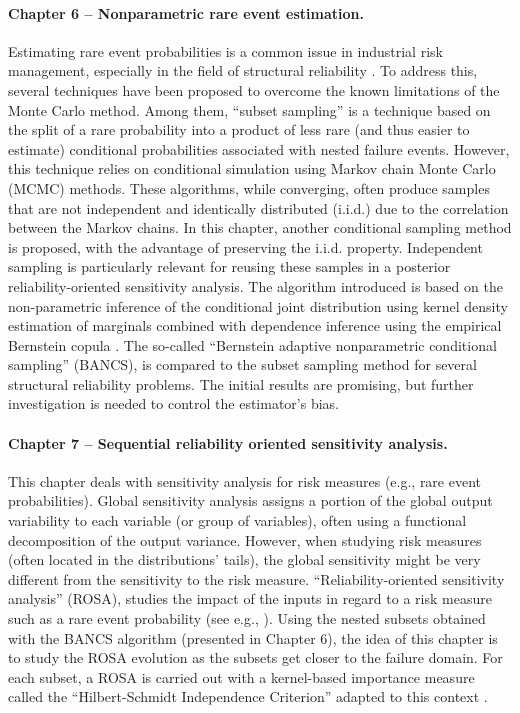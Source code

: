 \paragraph{Chapter 6 -- Nonparametric rare event estimation.} 
Estimating rare event probabilities is a common issue in industrial risk management, especially in the field of structural reliability \citep{chabridon_2018_thesis}. 
To address this, several techniques have been proposed to overcome the known limitations of the Monte Carlo method. 
Among them, ``subset sampling'' \citep{AuBeck2001} is a technique based on the split of a rare probability into a product of less rare (and thus easier to estimate) conditional probabilities associated with nested failure events. 
However, this technique relies on conditional simulation using Markov chain Monte Carlo (MCMC) methods. 
These algorithms, while converging, often produce samples that are not independent and identically distributed (i.i.d.) due to the correlation between the Markov chains.
In this chapter, another conditional sampling method is proposed, with the advantage of preserving the i.i.d. property. 
Independent sampling is particularly relevant for reusing these samples in a posterior reliability-oriented sensitivity analysis. 
The algorithm introduced is based on the non-parametric inference of the conditional joint distribution using kernel density estimation of marginals combined with dependence inference using the empirical Bernstein copula \citep{sancetta_satchell_2004}. 
The so-called ``Bernstein adaptive nonparametric conditional sampling'' (BANCS), is compared to the subset sampling method for several structural reliability problems. 
The initial results are promising, but further investigation is needed to control the estimator's bias.


\paragraph{Chapter 7 -- Sequential reliability oriented sensitivity analysis.} 
This chapter deals with sensitivity analysis for risk measures (e.g., rare event probabilities). 
Global sensitivity analysis \citep{daveiga_iooss_2021} assigns a portion of the global output variability to each variable (or group of variables), often using a functional decomposition of the output variance. 
However, when studying risk measures (often located in the distributions' tails), the global sensitivity might be very different from the sensitivity to the risk measure. 
``Reliability-oriented sensitivity analysis'' (ROSA), studies the impact of the inputs in regard to a risk measure such as a rare event probability (see e.g., \citet{chabridon_2018_thesis}). 
Using the nested subsets obtained with the BANCS algorithm (presented in Chapter 6), the idea of this chapter is to study the ROSA evolution as the subsets get closer to the failure domain. 
For each subset, a ROSA is carried out with a kernel-based importance measure called the ``Hilbert-Schmidt Independence Criterion'' adapted to this context \citep{marrel_chabridon_2021}. 

